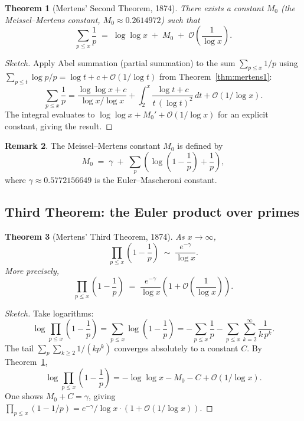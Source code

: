 \documentclass[12pt,a4paper]{amsart}
\newtheorem{theorem}{Theorem}[section]
\theoremstyle{definition}
\newtheorem{remark}[theorem]{Remark}
\newcommand{\BigO}{\mathcal{O}}
\begin{document}
\begin{theorem}[Mertens' Second Theorem, 1874]
\label{thm:mertens2}
There exists a constant $M_0$ (the \emph{Meissel--Mertens constant},
$M_0 \approx 0.2614972$) such that
\[
  \sum_{p \le x} \frac{1}{p} \;=\; \log\log x \;+\; M_0 \;+\; \BigO\!\left(\frac{1}{\log x}\right).
\]
\end{theorem}

\begin{proof}[Sketch]
Apply Abel summation (partial summation) to the sum $\sum_{p \le x} 1/p$
using $\sum_{p \le t} \log p / p = \log t + c + \BigO(1/\log t)$ from
Theorem~\ref{thm:mertens1}:
\[
  \sum_{p \le x}\frac{1}{p}
  = \frac{\log\log x + c}{\log x/\log x}
  + \int_2^x \frac{\log t + c}{t\,(\log t)^2}\,dt + \BigO(1/\log x).
\]
The integral evaluates to $\log\log x + M_0' + \BigO(1/\log x)$ for an
explicit constant, giving the result.
\end{proof}

\begin{remark}
The Meissel--Mertens constant $M_0$ is defined by
\[
  M_0 \;=\; \gamma \;+\; \sum_p \!\left(\log\!\left(1-\frac{1}{p}\right) + \frac{1}{p}\right),
\]
where $\gamma \approx 0.5772156649$ is the Euler--Mascheroni constant.
\end{remark}

\subsection{Third Theorem: the Euler product over primes}

\begin{theorem}[Mertens' Third Theorem, 1874]
\label{thm:mertens3}
As $x \to \infty$,
\[
  \prod_{p \le x} \left(1 - \frac{1}{p}\right)
  \;\sim\; \frac{e^{-\gamma}}{\log x}.
\]
More precisely,
\[
  \prod_{p \le x} \left(1 - \frac{1}{p}\right)
  \;=\; \frac{e^{-\gamma}}{\log x}
        \left(1 + \BigO\!\left(\frac{1}{\log x}\right)\right).
\]
\end{theorem}

\begin{proof}[Sketch]
Take logarithms:
\[
  \log \prod_{p \le x}\!\left(1-\frac{1}{p}\right)
  = \sum_{p \le x} \log\!\left(1-\frac{1}{p}\right)
  = -\sum_{p \le x}\frac{1}{p}
    - \sum_{p \le x}\sum_{k=2}^{\infty}\frac{1}{k\,p^k}.
\]
The tail $\sum_p \sum_{k \ge 2} 1/(kp^k)$ converges absolutely to a constant
$C$.  By Theorem~\ref{thm:mertens2},
\[
  \log \prod_{p \le x}\!\left(1-\frac{1}{p}\right)
  = -\log\log x - M_0 - C + \BigO(1/\log x).
\]
One shows $M_0 + C = \gamma$, giving
$\prod_{p \le x}(1-1/p) = e^{-\gamma}/\log x \cdot (1+\BigO(1/\log x))$.
\end{proof}
\end{document}
